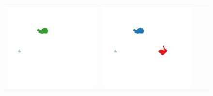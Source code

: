 \begin{figure}
\begin{tabularx}{1\textwidth}{XXXX}
\includegraphics[width=1\linewidth]{images/ch6/contig/01}&
\includegraphics[width=1\linewidth]{images/ch6/contig/02}&

\end{tabularx}
\end{figure}
